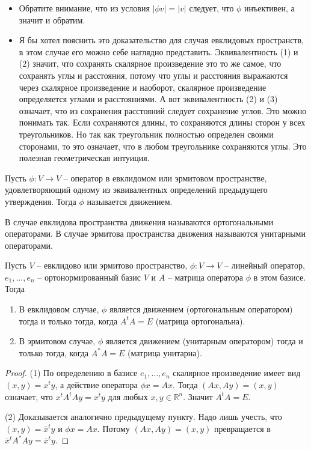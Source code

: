 \begin{itemize}
\item Обратите внимание, что из условия $|\phi v| = |v|$ следует, что $\phi$ инъективен, а значит и обратим.

\item Я бы хотел пояснить это доказательство для случая евклидовых пространств, в этом случае его можно себе наглядно представить.
Эквивалентность (1) и (2) значит, что сохранять скалярное произведение это то же самое, что сохранять углы и расстояния, потому что углы и расстояния выражаются через скалярное произведение и наоборот, скалярное произведение определяется углами и расстояниями.
А вот эквивалентность (2) и (3) означает, что из сохранения расстояний следует сохранение углов.
Это можно понимать так.
Если сохраняются длины, то сохраняются длины сторон у всех треугольников.
Но так как треугольник полностью определен своими сторонами, то это означает, что в любом треугольнике сохраняются углы.
Это полезная геометрическая интуиция.
\end{itemize}


\begin{definition}
Пусть $\phi\colon V\to V$ -- оператор в евклидомом или эрмитовом пространстве, удовлетворяющий одному из эквивалентных определений предыдущего утверждения.
Тогда $\phi$ называется движением.


В случае евклидова пространства движения называются ортогональными операторами.
В случае эрмитова пространства движения называются унитарными операторами.
\end{definition}



\begin{claim}
\label{claim::MovementMatrix}
Пусть $V$ -- евклидово или эрмитово пространство, $\phi\colon V\to V$ -- линейный оператор, $e_1,\ldots,e_n$ -- ортонормированный базис $V$ и $A$ -- матрица оператора $\phi$ в этом базисе.
Тогда
\begin{enumerate}
\item В евклидовом случае, $\phi$ является движением (ортогональным оператором) тогда и только тогда, когда $A^t A = E$ (матрица ортогональна).

\item В эрмитовом случае, $\phi$ является движением (унитарным оператором) тогда и только тогда, когда $A^*A = E$ (матрица унитарна).
\end{enumerate}
\end{claim}
\begin{proof}
(1) По определению в базисе $e_1,\ldots,e_n$ скалярное произведение имеет вид $(x,y) = x^t y$, а действие оператора $\phi x = A x$.
Тогда $(Ax, Ay) = (x, y)$ означает, что $x^t A^t A y = x^t y$ для любых $x,y\in \mathbb R^n$.
Значит $A^t A = E$.

(2) Доказывается аналогично предыдущему пункту.
Надо лишь учесть, что $(x, y) = \bar x^t y$ и $\phi x = Ax$.
Потому $(Ax, Ay) = (x,y)$ превращается в $\bar x^t A^* A y = \bar x^t y$.
\end{proof}

